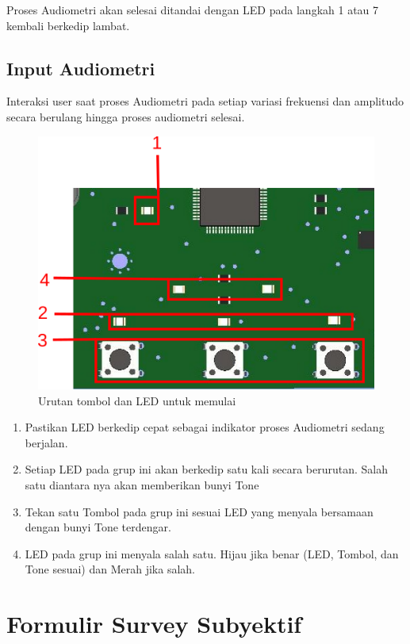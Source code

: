 \documentclass[12pt,]{article}
\begin{document}
	Proses Audiometri akan selesai ditandai dengan LED pada langkah 1 atau 7 kembali berkedip lambat.
	
	\newpage
	\subsection{Input Audiometri}
	
	Interaksi user saat proses Audiometri pada setiap variasi frekuensi dan amplitudo secara berulang hingga proses audiometri selesai.
	
	\begin{figure}[!ht]
		\centering
		\includegraphics[width=350pt]{images/ledbutton_input}
		\caption{Urutan tombol dan LED untuk memulai}
	\end{figure}
	
	\begin{enumerate}
		\item Pastikan LED berkedip cepat sebagai indikator proses Audiometri sedang berjalan.
		
		\item Setiap LED pada grup ini akan berkedip satu kali secara berurutan.
		Salah satu diantara nya akan memberikan bunyi Tone
		
		\item Tekan satu Tombol pada grup ini sesuai LED yang menyala bersamaan dengan bunyi Tone terdengar.
		
		\item LED pada grup ini menyala salah satu. Hijau jika benar (LED, Tombol, dan Tone sesuai) dan Merah jika salah.
	\end{enumerate}

	\newpage
	\section{Formulir Survey Subyektif}
	
\end{document}
